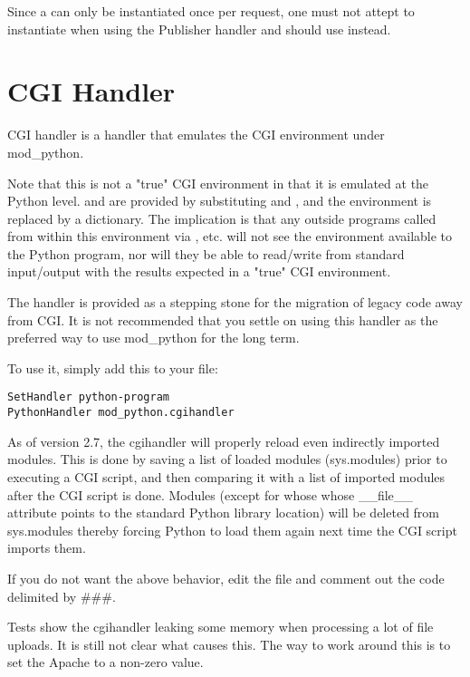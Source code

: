 Since a  can only be instantiated once per
request, one must not attept to instantiate  when
using the Publisher handler and should use
 instead.

\section{CGI Handler\label{hand-cgi}}


CGI handler is a handler that emulates the CGI environment under mod_python. 

Note that this is not a "true" CGI environment in that it is emulated
at the Python level.  and  are provided by
substituting  and , and the environment
is replaced by a dictionary. The implication is that any outside programs
called from within this environment via , etc. will
not see the environment available to the Python program, nor will they
be able to read/write from standard input/output with the results expected
in a "true" CGI environment.

The handler is provided as a stepping stone for the migration of legacy
code away from CGI. It is not recommended that you settle on using
this handler as the preferred way to use mod_python for the long term.

To use it, simply add this to your  file: 

\begin{verbatim}
SetHandler python-program
PythonHandler mod_python.cgihandler
\end{verbatim}

As of version 2.7, the cgihandler will properly reload even indirectly
imported modules. This is done by saving a list of loaded modules
(sys.modules) prior to executing a CGI script, and then comparing it
with a list of imported modules after the CGI script is done.  Modules
(except for whose whose __file__ attribute points to the standard
Python library location) will be deleted from sys.modules thereby
forcing Python to load them again next time the CGI script imports
them.

If you do not want the above behavior, edit the 
file and comment out the code delimited by \#\#\#.

Tests show the cgihandler leaking some memory when processing a lot of
file uploads. It is still not clear what causes this. The way to work
around this is to set the Apache  to a non-zero
value.


